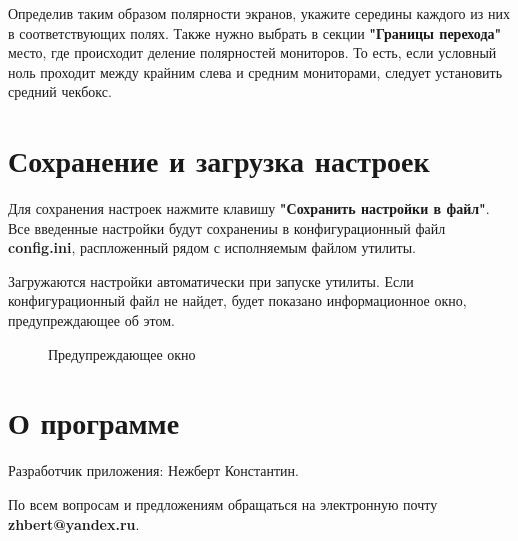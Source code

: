 \documentclass[a4paper]{article}
\begin{document}
Определив таким образом полярности экранов, укажите середины каждого из них в соответствующих полях. Также нужно выбрать в секции \textbf{"Границы перехода"} место, где происходит деление полярностей мониторов. То есть, если условный ноль проходит между крайним слева и средним мониторами, следует установить средний чекбокс.

\section{Сохранение и загрузка настроек}

Для сохранения настроек нажмите клавишу \textbf{"Сохранить настройки в файл"}. Все введенные настройки будут сохранениы в конфигурационный файл \textbf{config.ini}, распложенный рядом с исполняемым файлом утилиты.

Загружаются настройки автоматически при запуске утилиты. Если конфигурационный файл не найдет, будет показано информационное окно, предупреждающее об этом.

\begin{figure}[h]
	\caption{Предупреждающее окно}
	\label{fig:image4}
\end{figure}

\section{О программе}

Разработчик приложения: Нежберт Константин.

По всем вопросам и предложениям обращаться на электронную почту \\
\textbf{zhbert@yandex.ru}.
\end{document}
